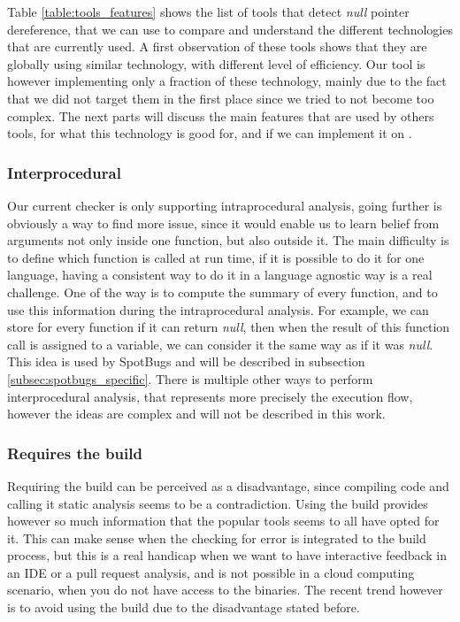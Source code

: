 Table \ref{table:tools_features} shows the list of tools that detect \emph{null} pointer dereference, that we can use to compare and understand the different technologies that are currently used.
A first observation of these tools shows that they are globally using similar technology, with different level of efficiency.
Our tool is however implementing only a fraction of these technology, mainly due to the fact that we did not target them in the first place since we tried to not become too complex. 
The next parts will discuss the main features that are used by others tools, for what this technology is good for, and if we can implement it on \slang{}.

\subsubsection{Interprocedural}
\label{subsubsec:inter_procedrual}

Our current checker is only supporting intraprocedural analysis, going further is obviously a way to find more issue, since it would enable us to learn belief from arguments not only inside one function, but also outside it.
The main difficulty is to define which function is called at run time, if it is possible to do it for one language, having a consistent way to do it in a language agnostic way is a real challenge. 
One of the way is to compute the summary of every function, and to use this information during the intraprocedural analysis. 
For example, we can store for every function if it can return \emph{null}, then when the result of this function call is assigned to a variable, we can consider it the same way as if it was \emph{null}. 
This idea is used by SpotBugs and will be described in subsection \ref{subsec:spotbugs_specific}. 
There is multiple other ways to perform interprocedural analysis, that represents more precisely the execution flow, however the ideas are complex and will not be described in this work.

\subsubsection{Requires the build}
\label{subsubsec:require_build}

Requiring the build can be perceived as a disadvantage, since compiling code and calling it static analysis seems to be a contradiction.
Using the build provides however so much information that the popular tools seems to all have opted for it.
This can make sense when the checking for error is integrated to the build process, but this is a real handicap when we want to have interactive feedback in an IDE or a pull request analysis, and is not possible in a cloud computing scenario, when you do not have access to the binaries. 
The recent trend however is to avoid using the build due to the disadvantage stated before.

